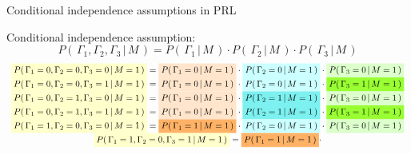 \begin{frame}{\vskip -0.3cm \Large Conditional independence assumptions in PRL}
\pause

\scriptsize
Conditional independence assumption:
\vskip -0.25cm
\begin{equation*}
P\!\left(\,\Gamma_{1},\Gamma_{2},\Gamma_{3}\,\vert\,M\,\right)
= P\!\left(\,\Gamma_{1}\,\vert\,M\,\right) \cdot P\!\left(\,\Gamma_{2}\,\vert\,M\,\right) \cdot P\!\left(\,\Gamma_{3}\,\vert\,M\,\right)
\end{equation*}
\pause
\vskip -0.75cm
{\tiny
\begin{equation*}
\begin{array}{c}
\colorbox{lightYellow}{$P\!\left(\,\Gamma_{1}=0,\Gamma_{2}=0,\Gamma_{3}=0\,\vert\,M=1\,\right)$}=
	\colorbox{lightOrange}{$P\!\left(\,\Gamma_{1}=0\,\vert\,M=1\,\right)$} \cdot
	\colorbox{lightCyan}{$P\!\left(\,\Gamma_{2}=0\,\vert\,M=1\,\right)$} \cdot
	\colorbox{lightGreen}{$P\!\left(\,\Gamma_{3}=0\,\vert\,M=1\,\right)$}
\\
\colorbox{lightYellow}{$P\!\left(\,\Gamma_{1}=0,\Gamma_{2}=0,\Gamma_{3}=1\,\vert\,M=1\,\right)$}=
	\colorbox{lightOrange}{$P\!\left(\,\Gamma_{1}=0\,\vert\,M=1\,\right)$} \cdot
	\colorbox{lightCyan}{$P\!\left(\,\Gamma_{2}=0\,\vert\,M=1\,\right)$} \cdot
	\colorbox{mediumGreen}{$P\!\left(\,\Gamma_{3}=1\,\vert\,M=1\,\right)$}
\\
\colorbox{lightYellow}{$P\!\left(\,\Gamma_{1}=0,\Gamma_{2}=1,\Gamma_{3}=0\,\vert\,M=1\,\right)$}=
	\colorbox{lightOrange}{$P\!\left(\,\Gamma_{1}=0\,\vert\,M=1\,\right)$} \cdot
	\colorbox{mediumCyan}{$P\!\left(\,\Gamma_{2}=1\,\vert\,M=1\,\right)$} \cdot
	\colorbox{lightGreen}{$P\!\left(\,\Gamma_{3}=0\,\vert\,M=1\,\right)$}
\\
\colorbox{lightYellow}{$P\!\left(\,\Gamma_{1}=0,\Gamma_{2}=1,\Gamma_{3}=1\,\vert\,M=1\,\right)$}=
	\colorbox{lightOrange}{$P\!\left(\,\Gamma_{1}=0\,\vert\,M=1\,\right)$} \cdot
	\colorbox{mediumCyan}{$P\!\left(\,\Gamma_{2}=1\,\vert\,M=1\,\right)$} \cdot
	\colorbox{mediumGreen}{$P\!\left(\,\Gamma_{3}=1\,\vert\,M=1\,\right)$}
\\
\colorbox{lightYellow}{$P\!\left(\,\Gamma_{1}=1,\Gamma_{2}=0,\Gamma_{3}=0\,\vert\,M=1\,\right)$}=
	\colorbox{mediumOrange}{$P\!\left(\,\Gamma_{1}=1\,\vert\,M=1\,\right)$} \cdot
	\colorbox{lightCyan}{$P\!\left(\,\Gamma_{2}=0\,\vert\,M=1\,\right)$} \cdot
	\colorbox{lightGreen}{$P\!\left(\,\Gamma_{3}=0\,\vert\,M=1\,\right)$}
\\
\colorbox{lightYellow}{$P\!\left(\,\Gamma_{1}=1,\Gamma_{2}=0,\Gamma_{3}=1\,\vert\,M=1\,\right)$}=
	\colorbox{mediumOrange}{$P\!\left(\,\Gamma_{1}=1\,\vert\,M=1\,\right)$} \cdot

\end{array}
\end{equation*}}
\end{frame}
